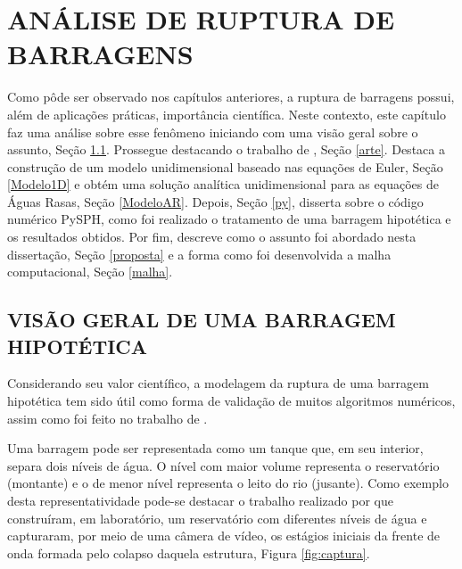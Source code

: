 \chapter{ANÁLISE DE RUPTURA DE BARRAGENS}

Como pôde ser observado nos capítulos anteriores, a ruptura de barragens possui, além de aplicações práticas, importância científica. Neste contexto, este capítulo faz uma análise sobre esse fenômeno iniciando com uma visão geral sobre o assunto, Seção \ref{visao}. Prossegue destacando o trabalho de , Seção \ref{arte}. Destaca a construção de um modelo unidimensional baseado nas equações de Euler, Seção \ref{Modelo1D} e obtém uma solução analítica unidimensional para as equações de Águas Rasas, Seção \ref{ModeloAR}. Depois, Seção \ref{py}, disserta sobre o código numérico PySPH, como foi realizado o tratamento de uma barragem hipotética e os resultados obtidos. Por fim, descreve como o assunto foi abordado nesta dissertação, Seção \ref{proposta} e a forma como foi desenvolvida a malha computacional, Seção \ref{malha}. 
    

\section{VISÃO GERAL DE UMA BARRAGEM HIPOTÉTICA} \label{visao}

Considerando seu valor científico, a modelagem da ruptura de uma barragem hipotética tem sido útil como forma de validação de muitos algoritmos numéricos, assim como foi feito no trabalho de .

Uma barragem pode ser representada como um tanque que, em seu interior, separa dois níveis de água. O nível com maior volume representa o reservatório (montante) e o de menor nível representa o leito do rio (jusante). Como exemplo desta representatividade pode-se destacar o trabalho realizado por  que construíram, em laboratório, um reservatório com diferentes níveis de água e capturaram, por meio de uma câmera de vídeo, os estágios iniciais da frente de onda formada pelo colapso daquela estrutura, Figura \ref{fig:captura}.

